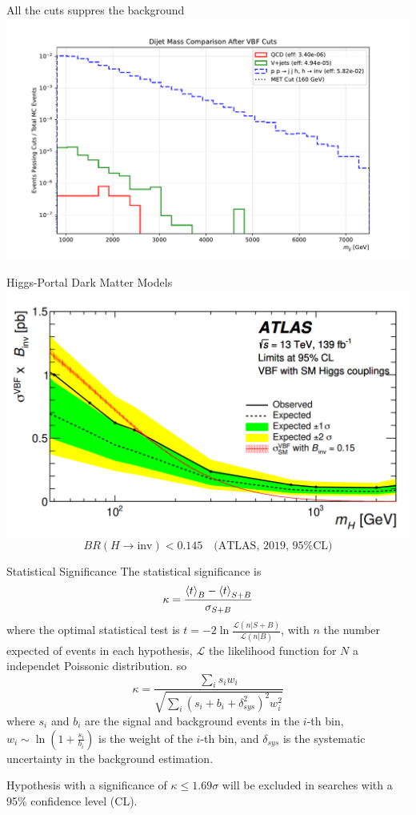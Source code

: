 \documentclass{../../bredelebeamer}
\begin{document}
\begin{frame}{All the cuts suppres the background}
    \includegraphics[width=1.1\textwidth]{../Images/met_comparison_after_vbf_cuts.pdf}
\end{frame}

\begin{frame}{Higgs-Portal Dark Matter Models}
    \includegraphics[width=\textwidth]{../Images/Altas_Result.png}
    $$
        BR(H \to \text{inv}) < 0.145 \quad \text{(ATLAS, 2019, 95\% CL)}
    $$
\end{frame}


\begin{frame}{Statistical Significance}
    The statistical significance is 
    \begin{equation}
        \kappa = \frac{\Braket{t}_{B} - \Braket{t}_{S+B}}{\sigma_{S+B}}
    \end{equation}
    where the optimal statistical test is $t=-2\ln \frac{\mathcal{L}(n|S+B)}{\mathcal{L}(n|B)}$, with $n$ the number expected of events in each hypothesis, $\mathcal{L}$ the likelihood function for $N$ a independet Poissonic distribution. so
    \begin{equation}
        \kappa = \frac{\sum_i s_i w_i}{\sqrt{\sum_i (s_i + b_i + \delta_{sys}^2)^2 w_i^2}}
    \end{equation}
    where $s_i$ and $b_i$ are the signal and background events in the $i$-th bin, $w_i\sim \ln (1+\frac{s_i}{b_i})$ is the weight of the $i$-th bin, and $\delta_{sys}$ is the systematic uncertainty in the background estimation.

    Hypothesis with a significance of $\kappa \leq 1.69\sigma$ will be excluded in searches with a 95\% confidence level (CL).
\end{frame}
\end{document}
